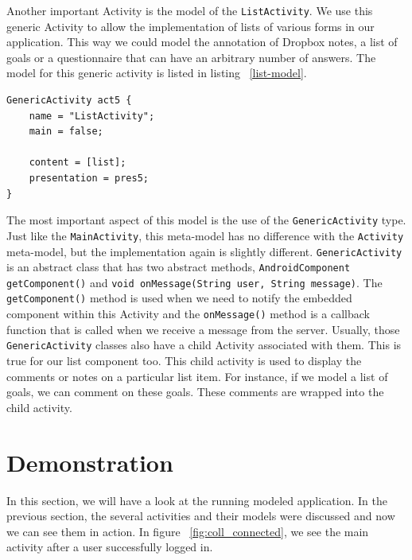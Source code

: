 Another important Activity is the model of the \texttt{ListActivity}. We use this generic Activity to allow the implementation of lists of various forms in our application. This way we could model the annotation of Dropbox notes, a list of goals or a questionnaire that can have an arbitrary number of answers. The model for this generic activity is listed in listing ~\ref{list-model}.
\begin{lstlisting}[label=list-model,caption=ListActivity model, captionpos=t]
GenericActivity act5 {
	name = "ListActivity";
	main = false;

	content = [list];
	presentation = pres5;
}
\end{lstlisting}
The most important aspect of this model is the use of the \texttt{GenericActivity} type. Just like the \texttt{MainActivity}, this meta-model has no difference with the \texttt{Activity} meta-model, but the implementation again is slightly different. \texttt{GenericActivity} is an abstract class that has two abstract methods, \texttt{AndroidComponent getComponent()} and \texttt{void onMessage(String user, String message)}. The \texttt{getComponent()} method is used when we need to notify the embedded component within this Activity and the \texttt{onMessage()} method is a callback function that is called when we receive a message from the server. Usually, those \texttt{GenericActivity} classes also have a child Activity associated with them. This is true for our list component too. This child activity is used to display the comments or notes on a particular list item. For instance, if we model a list of goals, we can comment on these goals. These comments are wrapped into the child activity.

\section{Demonstration}

In this section, we will have a look at the running modeled application. In the previous section, the several activities and their models were discussed and now we can see them in action. In figure ~\ref{fig:coll_connected}, we see the main activity after a user successfully logged in. 
 
